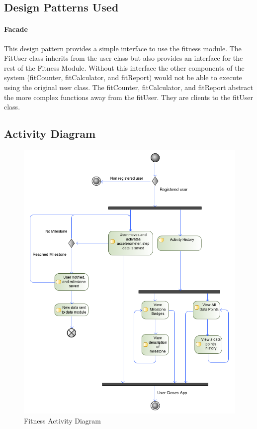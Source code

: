 \subsection{Design Patterns Used}
\paragraph{Facade}
This design pattern provides a simple interface to use the fitness module. The FitUser class inherits from the user class but also provides an interface for the rest of the Fitness Module. Without this interface the other components of the system (fitCounter, fitCalculator, and fitReport) would not be able to execute using the original user class. The fitCounter, fitCalculator, and fitReport abstract the more complex functions away from the fitUser. They are clients to the fitUser class.

\subsection{Activity Diagram}
\begin{figure}[H]
	\centering
	\includegraphics[scale=0.44]{Fitness/fitness_activity_diagram.png}
	\caption{Fitness Activity Diagram}
	\label{fig:fitness_activity_diagram}
\end{figure}

